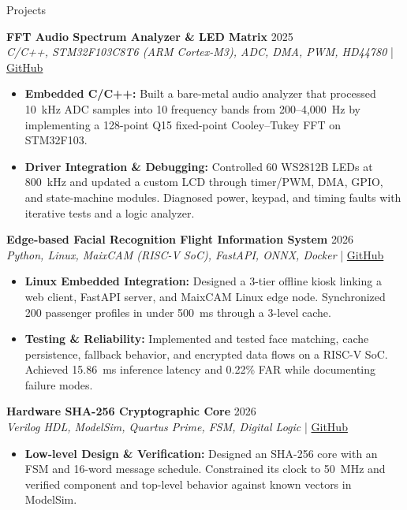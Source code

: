 \documentclass{resume}
\begin{document}
\begin{rSection}{Projects}
\vspace{-0.7em}

\item \textbf{FFT Audio Spectrum Analyzer \& LED Matrix} \hfill 2025\\
{\small \textit{C/C++, STM32F103C8T6 (ARM Cortex-M3), ADC, DMA, PWM, HD44780}} \hfill | \href{https://github.com/pckienuit/led}{GitHub}
\begin{itemize}
    \itemsep -3pt {}
    \item \textbf{Embedded C/C++:} Built a bare-metal audio analyzer that processed 10~kHz ADC samples into 10 frequency bands from 200--4,000~Hz by implementing a 128-point Q15 fixed-point Cooley--Tukey FFT on STM32F103.
    \item \textbf{Driver Integration \& Debugging:} Controlled 60 WS2812B LEDs at 800~kHz and updated a custom LCD through timer/PWM, DMA, GPIO, and state-machine modules. Diagnosed power, keypad, and timing faults with iterative tests and a logic analyzer.
\end{itemize}

\item \textbf{Edge-based Facial Recognition Flight Information System} \hfill 2026\\
{\small \textit{Python, Linux, MaixCAM (RISC-V SoC), FastAPI, ONNX, Docker}} \hfill | \href{https://github.com/pckienuit/AIoT_DoAn}{GitHub}
\begin{itemize}
    \itemsep -3pt {}
    \item \textbf{Linux Embedded Integration:} Designed a 3-tier offline kiosk linking a web client, FastAPI server, and MaixCAM Linux edge node. Synchronized 200 passenger profiles in under 500~ms through a 3-level cache.
    \item \textbf{Testing \& Reliability:} Implemented and tested face matching, cache persistence, fallback behavior, and encrypted data flows on a RISC-V SoC. Achieved 15.86~ms inference latency and 0.22\% FAR while documenting failure modes.
\end{itemize}

\item \textbf{Hardware SHA-256 Cryptographic Core} \hfill 2026\\
{\small \textit{Verilog HDL, ModelSim, Quartus Prime, FSM, Digital Logic}} \hfill | \href{https://github.com/pckienuit/SHA-256}{GitHub}
\begin{itemize}
    \itemsep -3pt {}
    \item \textbf{Low-level Design \& Verification:} Designed an SHA-256 core with an FSM and 16-word message schedule. Constrained its clock to 50~MHz and verified component and top-level behavior against known vectors in ModelSim.
\end{itemize}

\end{rSection}
\end{document}

